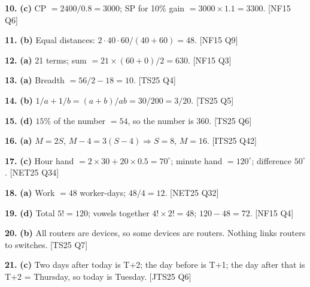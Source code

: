 \documentclass[11pt,a4paper]{article}
\begin{document}
\noindent\textbf{10.} \textbf{(c)} CP $=2400/0.8=3000$; SP for 10\% gain $=3000\times1.1=3300$. {\color{ember}\scriptsize[NF15 Q6]}\par\vspace{3pt}
\noindent\textbf{11.} \textbf{(b)} Equal distances: $2\cdot40\cdot60/(40+60)=48$. {\color{ember}\scriptsize[NF15 Q9]}\par\vspace{3pt}
\noindent\textbf{12.} \textbf{(a)} 21 terms; sum $=21\times(60+0)/2=630$. {\color{ember}\scriptsize[NF15 Q3]}\par\vspace{3pt}
\noindent\textbf{13.} \textbf{(a)} Breadth $=56/2-18=10$. {\color{ember}\scriptsize[TS25 Q4]}\par\vspace{3pt}
\noindent\textbf{14.} \textbf{(b)} $1/a+1/b=(a+b)/ab=30/200=3/20$. {\color{ember}\scriptsize[TS25 Q5]}\par\vspace{3pt}
\noindent\textbf{15.} \textbf{(d)} $15\%$ of the number $=54$, so the number is 360. {\color{ember}\scriptsize[TS25 Q6]}\par\vspace{3pt}
\noindent\textbf{16.} \textbf{(a)} $M=2S$, $M-4=3(S-4) \Rightarrow S=8$, $M=16$. {\color{ember}\scriptsize[ITS25 Q42]}\par\vspace{3pt}
\noindent\textbf{17.} \textbf{(c)} Hour hand $=2\times30+20\times0.5=70^\circ$; minute hand $=120^\circ$; difference $50^\circ$. {\color{ember}\scriptsize[NET25 Q34]}\par\vspace{3pt}
\noindent\textbf{18.} \textbf{(a)} Work $=48$ worker-days; $48/4=12$. {\color{ember}\scriptsize[NET25 Q32]}\par\vspace{3pt}
\noindent\textbf{19.} \textbf{(d)} Total $5!=120$; vowels together $4!\times2!=48$; $120-48=72$. {\color{ember}\scriptsize[NF15 Q4]}\par\vspace{3pt}
\noindent\textbf{20.} \textbf{(b)} All routers are devices, so some devices are routers. Nothing links routers to switches. {\color{ember}\scriptsize[TS25 Q7]}\par\vspace{3pt}
\noindent\textbf{21.} \textbf{(c)} Two days after today is T+2; the day before is T+1; the day after that is T+2 = Thursday, so today is Tuesday. {\color{ember}\scriptsize[JTS25 Q6]}\par\vspace{3pt}
\end{document}
